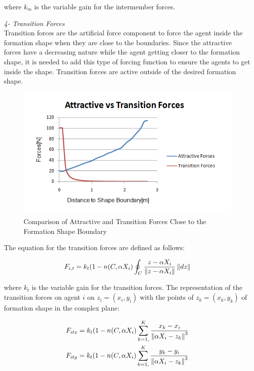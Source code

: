 where $k_m$ is the variable gain for the intermember forces.  \newline
			
\textit{4- Transition Forces} \\ 		
Transition forces are the artificial force component to force the agent inside the formation shape when they are close to the boundaries. Since the attractive forces have a decreasing nature while the agent getting closer to the formation shape, it is needed to add this type of forcing function to ensure the agents to get inside the shape. Transition forces are active outside of the desired formation shape.
			
\begin{figure}[H]
\caption{Comparison of Attractive and Transition Forces Close to the Formation Shape Boundary}
\centering
\includegraphics[scale = 0.80]{transition_forces}
\end{figure}		

The equation for the transition forces are defined as follows:	
				
\begin{equation}
F_{i,t} = k_t (1-n(C,\alpha X_i) \oint_C \frac{z-\alpha X_i}{\left\lVert z-\alpha X_i\right\rVert}\left\lVert dz\right\rVert
\end{equation}
				
where $k_t$ is the variable gain for the transition forces. The representation of the transition forces on agent $i$ on $z_i = (x_i, y_i)$ with the points of  $z_k = (x_k,y_k)$ of formation shape in the complex plane:
			
\begin{align*}
&F_{itx} = k_t  (1-n(C,\alpha X_i) \sum_{k=1,}^{K}\frac{x_k- x_i}{\left\lVert\alpha X_i - z_k\right\rVert^3}\\
&F_{ity} = k_t  (1-n(C,\alpha X_i) \sum_{k=1,}^{K}\frac{y_k- y_i}{\left\lVert\alpha X_i - z_k\right\rVert^3}\\
\end{align*}
			
